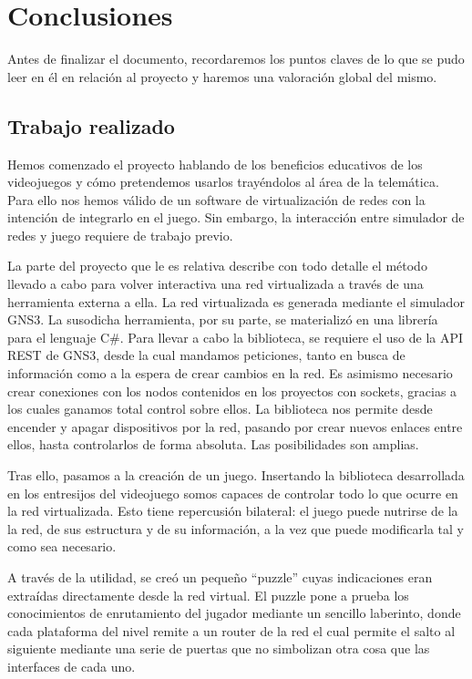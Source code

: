 \chapter{Conclusiones}\label{chap:Conclusiones}
Antes de finalizar el documento, recordaremos los puntos claves de lo que se pudo leer en él en relación al proyecto y haremos una valoración global del mismo.

\section{Trabajo realizado}
Hemos comenzado el proyecto hablando de los beneficios educativos de los videojuegos y cómo pretendemos usarlos trayéndolos al área de la telemática. Para ello nos hemos válido de un software de virtualización de redes con la intención de integrarlo en el juego. Sin embargo, la interacción entre simulador de redes y juego requiere de trabajo previo.

La parte del proyecto que le es relativa describe con todo detalle el método llevado a cabo para volver interactiva una red virtualizada a través de una herramienta externa a ella. La red virtualizada es generada mediante el simulador GNS3. La susodicha herramienta, por su parte, se materializó en una librería para el lenguaje C\#. Para llevar a cabo la biblioteca, se requiere el uso de la API REST de GNS3, desde la cual mandamos peticiones, tanto en busca de información como a la espera de crear cambios en la red.  Es asimismo necesario crear conexiones con los nodos contenidos en los proyectos con sockets, gracias a los cuales ganamos total control sobre ellos. La biblioteca nos permite desde encender y apagar dispositivos por la red, pasando por crear nuevos enlaces entre ellos, hasta controlarlos de forma absoluta. Las posibilidades son amplias.

Tras ello, pasamos a la creación de un juego. Insertando la biblioteca desarrollada en los entresijos del videojuego somos capaces de controlar todo lo que ocurre en la red virtualizada. Esto tiene repercusión bilateral: el juego puede nutrirse de la la red, de sus estructura y de su información, a la vez que puede modificarla tal y como sea necesario.

A través de la utilidad, se creó un pequeño ``puzzle'' cuyas indicaciones eran extraídas directamente desde la red virtual. El puzzle pone a prueba los conocimientos de enrutamiento del jugador mediante un sencillo laberinto, donde cada plataforma del nivel remite a un router de la red el cual permite el salto al siguiente mediante una serie de puertas que no simbolizan otra cosa que las interfaces de cada uno.

